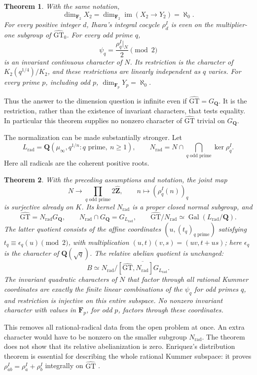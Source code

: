 \documentclass[11pt,a4paper]{article}
\newtheorem{theorem}{Theorem}[section]
\theoremstyle{definition}
\theoremstyle{remark}
\newcommand{\GT}{\widehat{\mathrm{GT}}}
\newcommand{\GTz}{\widehat{\mathrm{GT}}_0}
\newcommand{\Zh}{\widehat{\mathbf Z}}
\newcommand{\Q}{\mathbf Q}
\newcommand{\F}{\mathbf F}
\newcommand{\GQ}{G_{\Q}}
\DeclareMathOperator{\Gal}{Gal}
\begin{document}
\begin{theorem}\label{thm:main-dimension}
With the same notation,
\[
 \dim_{\F_2} X_2=\dim_{\F_2}\operatorname{im}(X_2\longrightarrow Y_2)=\aleph_0.
\]
For every positive integer $d$, Ihara's integral cocycle $\rho_d^I$ is even on the multiplier-one subgroup of $\GTz$. For every odd prime $q$,
\[
 \psi_q=\frac{\rho_q^I|_N}{2}\pmod2
\]
is an invariant continuous character of $N$. Its restriction is the character of $K_2(q^{1/4})/K_2$, and these restrictions are linearly independent as $q$ varies. For every prime $p$, including odd $p$, $\dim_{\F_p}Y_p=\aleph_0$.
\end{theorem}

Thus the answer to the dimension question is infinite even if $\GT=\GQ$. It is the restriction, rather than the existence of invariant characters, that tests equality. In particular this theorem supplies no nonzero character of $\GT$ trivial on $\GQ$.

The normalization can be made substantially stronger. Let
\[
 L_{\mathrm{rad}}=\Q(\mu_\infty,q^{1/n}:q\text{ prime},\ n\geq1),
 \qquad
 N_{\mathrm{rad}}=N\cap\bigcap_{q\text{ odd prime}}\ker\rho_q^I.
\]
Here all radicals are the coherent positive roots.

\begin{theorem}\label{thm:main-rational-normalization}
With the preceding assumptions and notation, the joint map
\[
 N\longrightarrow\prod_{q\text{ odd prime}}2\Zh,
 \qquad n\longmapsto(\rho_q^I(n))_q
\]
is surjective already on $K$. Its kernel $N_{\mathrm{rad}}$ is
a proper closed normal subgroup, and
\[
 \GT=N_{\mathrm{rad}}\GQ,\qquad
 N_{\mathrm{rad}}\cap\GQ=G_{L_{\mathrm{rad}}},\qquad
 \GT/N_{\mathrm{rad}}\simeq\Gal(L_{\mathrm{rad}}/\Q).
\]
The latter quotient consists of the affine coordinates
$(u,(t_q)_{q\text{ prime}})$ satisfying
$t_q\equiv\epsilon_q(u)\pmod2$, with multiplication
$(u,t)(v,s)=(uv,t+us)$; here $\epsilon_q$ is the character of
$\Q(\sqrt q)$. The relative abelian quotient is unchanged:
\[
 B\simeq N_{\mathrm{rad}}/
       \overline{[\GT,N_{\mathrm{rad}}]G_{L_{\mathrm{rad}}}}.
\]
The invariant quadratic characters of $N$ that factor through all
rational Kummer coordinates are exactly the finite linear combinations
of the $\psi_q$ for odd primes $q$, and restriction is injective on
this entire subspace. No nonzero invariant character with values in
$\F_p$, for odd $p$, factors through these coordinates.
\end{theorem}

This removes all rational-radical data from the open problem at once.
An extra character would have to be nonzero on the smaller subgroup
$N_{\mathrm{rad}}$. The theorem does not show that its relative
abelianization is zero. Enriquez's distribution theorem is essential
for describing the whole rational Kummer subspace: it proves
$\rho_{ab}^I=\rho_a^I+\rho_b^I$ integrally on $\GT$
\cite[Theorem~8.1 and Remark~8.6]{Enriquez2007}.
\end{document}
